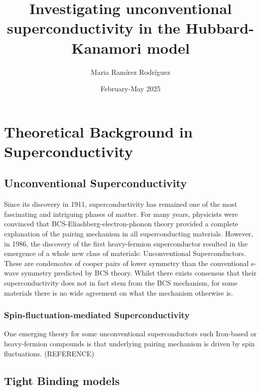 \documentclass[12pt]{article}
\title{Investigating unconventional superconductivity in the Hubbard-Kanamori model}
\author{Maria Ramírez Rodríguez}
\date{February-May 2025}
\begin{document}
\maketitle
\tableofcontents 


\section{Theoretical Background in Superconductivity}




\subsection{Unconventional Superconductivity}

Since its discovery in 1911\cite{onnes1911superconductivity}, superconductivity has remained one of the most fascinating and intriguing phases of matter. 
For many years, physicists were convinced that BCS-Eliashberg-electron-phonon theory \cite{schrieffer2018theory} provided a complete explanation of the pairing mechanism in all superconducting materials. 
However, in 1986, the discovery of the first heavy-fermion superconductor\cite{bednorz1986possible} resulted in the emergence of a whole new class of materials: Unconventional Superconductors. 
These are condensates of cooper pairs of lower symmetry than the conventional s-wave symmetry predicted by BCS theory. Whilst there exists consensus that their superconductivity does not in fact stem from the BCS mechanism, for some materials there is no wide agreement on what the mechanism otherwise is. 


\subsubsection{Spin-fluctuation-mediated Superconductivity}

One emerging theory for some unconventional superconductors such Iron-based or heavy-fermion compounds is that underlying pairing mechanism is driven by spin fluctuations. (REFERENCE)





\subsection{Tight Binding models}
\end{document}
